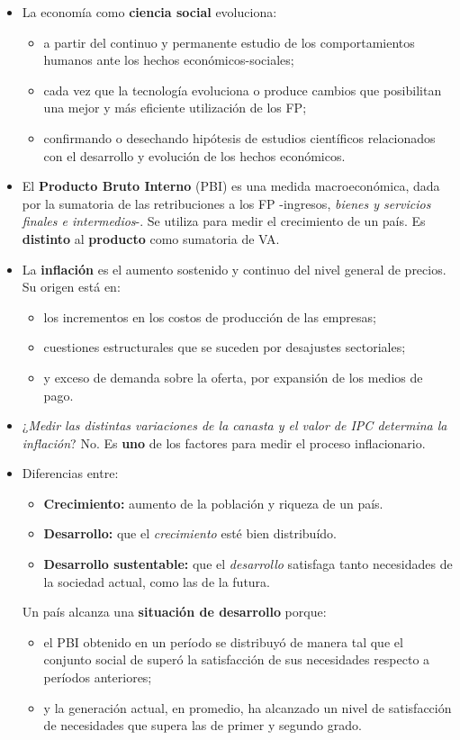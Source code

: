 \documentclass[10pt,a4paper]{article}
\begin{document}
\begin{itemize}
\item La economía como \textbf{ciencia social} evoluciona:
\begin{itemize}
\item a partir del continuo y permanente estudio de los comportamientos humanos ante los hechos económicos-sociales;
\item cada vez que la tecnología evoluciona o produce cambios que posibilitan una mejor y más eficiente utilización de los FP;
\item confirmando o desechando hipótesis de estudios científicos relacionados con el desarrollo y evolución de los hechos económicos.
\end{itemize}

\item El \textbf{Producto Bruto Interno} (PBI) es una medida macroeconómica, dada por la sumatoria de las retribuciones a los FP -ingresos, \textit{bienes y servicios finales e intermedios}-. Se utiliza para medir el crecimiento de un país. Es \textbf{distinto} al \textbf{producto} como sumatoria de VA.

\item La \textbf{inflación} es el aumento sostenido y continuo del nivel general de precios. Su origen está en:
\begin{itemize}
\item los incrementos en los costos de producción de las empresas;
\item cuestiones estructurales que se suceden por desajustes sectoriales;
\item y exceso de demanda sobre la oferta, por expansión de los medios de pago.
\end{itemize}

\item ¿\textit{Medir las distintas variaciones de la canasta y el valor de IPC determina la inflación}? No. Es \textbf{uno} de los factores para medir el proceso inflacionario.
\item Diferencias entre:
\begin{itemize}
\item \textbf{Crecimiento:} aumento de la población y riqueza de un país.
\item \textbf{Desarrollo:} que el \textit{crecimiento} esté bien distribuído.
\item \textbf{Desarrollo sustentable:} que el \textit{desarrollo} satisfaga tanto necesidades de la sociedad actual, como las de la futura.
\end{itemize}
Un país alcanza una \textbf{situación de desarrollo} porque:
\begin{itemize}
\item el PBI obtenido en un período se distribuyó de manera tal que el conjunto social de superó la satisfacción de sus necesidades respecto a períodos anteriores;
\item y la generación actual, en promedio, ha alcanzado un nivel de satisfacción de necesidades que supera las de primer y segundo grado.
\end{itemize}


\end{itemize}
\end{document}
